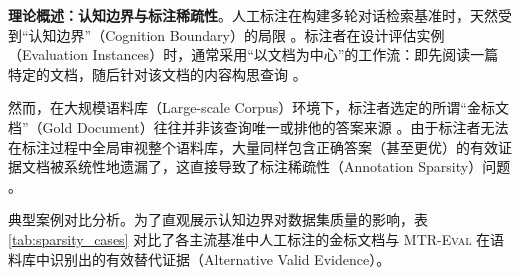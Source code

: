\textbf{理论概述：认知边界与标注稀疏性}。人工标注在构建多轮对话检索基准时，天然受到“认知边界”（Cognition Boundary）的局限 。标注者在设计评估实例（Evaluation Instances）时，通常采用“以文档为中心”的工作流：即先阅读一篇特定的文档，随后针对该文档的内容构思查询 。

然而，在大规模语料库（Large-scale Corpus）环境下，标注者选定的所谓“金标文档”（Gold Document）往往并非该查询唯一或排他的答案来源 。由于标注者无法在标注过程中全局审视整个语料库，大量同样包含正确答案（甚至更优）的有效证据文档被系统性地遗漏了，这直接导致了标注稀疏性（Annotation Sparsity）问题 。

\textbf{}{典型案例对比分析。}为了直观展示认知边界对数据集质量的影响，表 \ref{tab:sparsity_cases} 对比了各主流基准中人工标注的金标文档与 \textsc{MTR-Eval} 在语料库中识别出的有效替代证据（Alternative Valid Evidence）。

